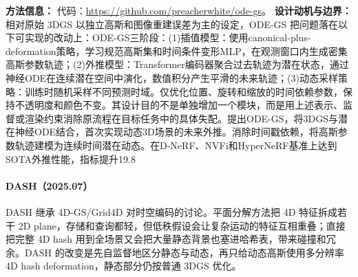 \textbf{方法信息：} 代码：\url{https://github.com/preacherwhite/ode-gs}。
\textbf{设计动机与边界：} 相对原始 3DGS 以独立高斯和图像重建误差为主的设定，ODE-GS 把问题落在以下可实现的改动上：ODE-GS三阶段：(1)插值模型：使用canonical-plus-deformation策略，学习规范高斯集和时间条件变形MLP，在观测窗口内生成密集高斯参数轨迹；(2)外推模型：Transformer编码器聚合过去轨迹为潜在状态，通过神经ODE在连续潜在空间中演化，数值积分产生平滑的未来轨迹；(3)动态采样策略：训练时随机采样不同预测时域。仅优化位置、旋转和缩放的时间依赖参数，保持不透明度和颜色不变。其设计目的不是单独增加一个模块，而是用上述表示、监督或渲染约束消除原流程在目标任务中的具体失配。提出ODE-GS，将3DGS与潜在神经ODE结合，首次实现动态3D场景的未来外推。消除时间戳依赖，将高斯参数轨迹建模为连续时间潜在动态。在D-NeRF、NVFi和HyperNeRF基准上达到SOTA外推性能，指标提升19.8%
\paragraph{DASH（2025.07）\cite{2507_19141}}
DASH 继承 4D-GS/Grid4D 对时空编码的讨论。平面分解方法把 4D 特征拆成若干 2D plane，存储和查询都轻，但低秩假设会让复杂运动的特征互相重叠；直接把完整 4D hash 用到全场景又会把大量静态背景也塞进哈希表，带来碰撞和冗余。DASH 的改变是先自监督地区分静态与动态，再只给动态高斯使用多分辨率 4D hash deformation，静态部分仍按普通 3DGS 优化。

